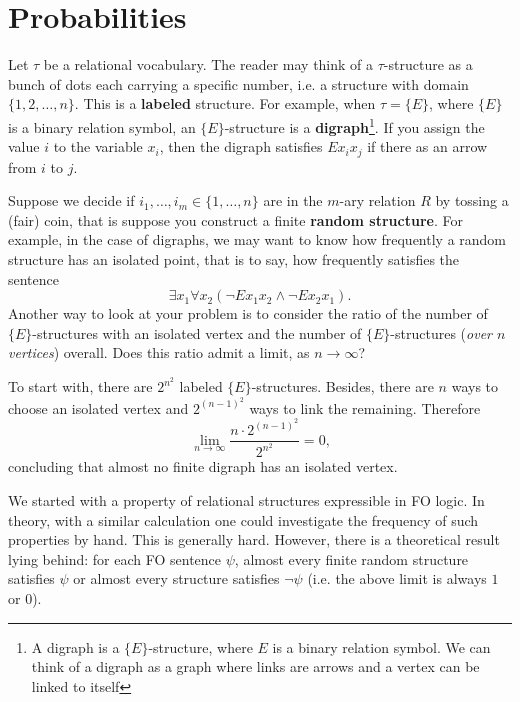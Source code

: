 \chapter{Probabilities}

Let $\tau$ be a relational vocabulary. 
The reader may think of a $\tau$-structure as a bunch of dots each carrying a specific number, i.e. a structure with domain $\{1, 2, \ldots, n\}$. 
This is a \textbf{labeled} structure. 
For example, when $\tau=\{E\}$, where $\{E \}$ is a binary relation symbol, an $\{E\}$-structure is a \textbf{digraph}\footnote{A digraph is a $\{E\}$-structure, where $E$ is a binary relation symbol. 
We can think of a digraph as a graph where links are arrows and a vertex can be linked to itself}. 
If you assign the value $i$ to the variable $x_i$, then the digraph satisfies $Ex_i x_j$ if there as an arrow from $i$ to $j$.

Suppose we decide if $i_1, \ldots, i_m \in \{1,\ldots,n\}$ are in the $m$-ary relation $R$ by tossing a (fair) coin, that is suppose you construct a finite \textbf{random structure}. 
For example, in the case of digraphs, we may want to know how frequently a random structure has an isolated point, that is to say, how frequently satisfies the sentence 
$$ \exists x_1 \forall x_2 (\lnot Ex_1 x_2 \land \lnot Ex_2 x_1) \text{.}$$
Another way to look at your problem is to consider the ratio of the number of $\{E\}$-structures with an isolated vertex and the number of $\{E\}$-structures (\textit{over $n$ vertices}) overall. 
Does this ratio admit a limit, as $n \to \infty$? 

To start with, there are $ 2 ^{n^2}$ labeled $\{E\}$-structures. 
Besides, there are $n$ ways to choose an isolated vertex and $2 ^{(n-1)^2}$ ways to link the remaining. 
Therefore
$$ \lim_{n \to \infty} \frac{n \cdot 2 ^{(n-1)^2}}{2 ^{n^2}}=0\text{,} $$
concluding that almost no finite digraph has an isolated vertex.  

We started with a property of relational structures expressible in FO logic. 
In theory, with a similar calculation one could investigate the frequency of such properties by hand. 
This is generally hard. 
However, there is a theoretical result lying behind: for each FO sentence $\psi$, almost every finite random structure satisfies $\psi$ or almost every structure satisfies $\lnot \psi$ (i.e. the above limit is always $1$ or $0$).

